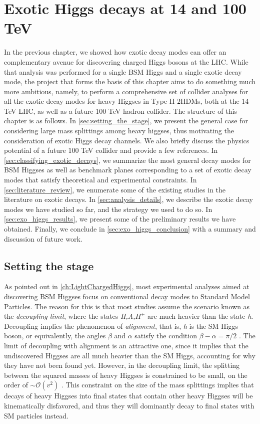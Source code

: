 \chapter{Exotic Higgs decays at 14 and 100 TeV}\label{ch:ExoticHiggs}

In the previous chapter, we showed how exotic decay modes can offer an complementary avenue for discovering charged Higgs bosons at the LHC. While that analysis was performed for a single BSM Higgs and a single exotic decay mode, the project that forms the basis of this chapter aims to do something much more ambitious, namely, to perform a comprehensive set of collider analyses for all the exotic decay modes for heavy Higgses in Type II $2$HDMs, both at the 14 TeV LHC, as well as a future 100 TeV hadron collider. The structure of this chapter is as follows. In \autoref{sec:setting_the_stage}, we present the general case for considering large mass splittings among heavy higgses, thus motivating the consideration of exotic Higgs decay channels. We also briefly discuss the physics potential of a future 100 TeV collider and provide a few references. In \autoref{sec:classifying_exotic_decays}, we summarize the most general decay modes for BSM Higgses as well as benchmark planes corresponding to a set of exotic decay modes that satisfy theoretical and experimental constraints. In \autoref{sec:literature_review}, we enumerate some of the existing studies in the literature on exotic decays. In \autoref{sec:analysis_details}, we describe the exotic decay modes we have studied so far, and the strategy we used to do so. In \autoref{sec:exo_higgs_results}, we present some of the preliminary results we have obtained. Finally, we conclude in \autoref{sec:exo_higgs_conclusion} with a summary and discussion of future work.

\section{Setting the stage}\label{sec:setting_the_stage}
As pointed out in \autoref{ch:LightChargedHiggs}, most experimental analyses aimed at discovering BSM Higgses focus on conventional decay modes to Standard Model Particles. The reason for this is that most studies assume the scenario known as the \emph{decoupling limit}, where the states \emph{H,A,$H^\pm$} are much heavier than the state \emph{h}. Decoupling implies the phenomenon of \emph{alignment}, that is, \emph{h} is the SM Higgs boson, or equivalently, the angles $\beta$ and $\alpha$ satisfy the condition $\beta-\alpha = \pi/2$ \cite{Contino:2016spe}. The limit of decoupling with alignment is an attractive one, since it implies that the undiscovered Higgses are all much heavier than the SM Higgs, accounting for why they have not been found yet. However, in the decoupling limit, the splitting between the squared masses of heavy Higgses is constrained to be small, on the order of $\sim\mathcal{O}(v^2)$ \cite{Gunion:2002zf}.
This constraint on the size of the mass splittings implies that decays of heavy Higgses into final states that contain other heavy Higgses will be kinematically disfavored, and thus they will dominantly decay to final states with SM particles instead.

